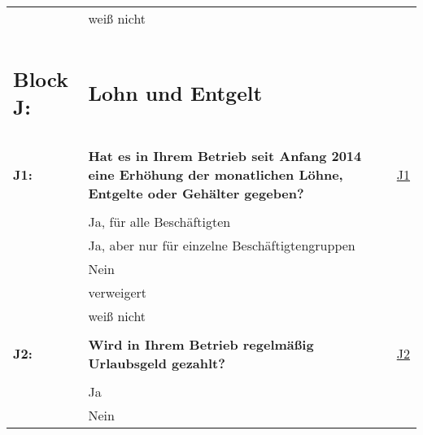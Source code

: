 \begin{longtable}{!{\color{black}\vline width 1pt}  L{2cm}!{\color{black}\vline width 1pt} L{12.25cm}!{\color{black}\vline width 1pt}  L{2.5cm}!{\color{black}\vline width 1pt}}
   & weiß nicht &  \\ 
   &  &  \\ 
   \midrule
{}\protect\subsection[\parbox{\mylength}{Block J:} Lohn und Entgelt]{Block J:} & \protect\subsection*{Lohn und Entgelt} &  \\ 
   &  &  \\ 
   \midrule
{}\textbf{J1:}\label{J1} & \textbf{Hat es in Ihrem Betrieb seit Anfang 2014 eine Erhöhung der monatlichen Löhne, Entgelte oder Gehälter gegeben?} & \hyperref[var:J1]{J1} \\ 
   &  &  \\ 
   & Ja, für alle Beschäftigten &  \\ 
   & Ja, aber nur für einzelne Beschäftigtengruppen &  \\ 
   & Nein &  \\ 
   & verweigert &  \\ 
   & weiß nicht &  \\ 
   &  &  \\ 
   \midrule
{}\textbf{J2:}\label{J2} & \textbf{Wird in Ihrem Betrieb regelmäßig Urlaubsgeld gezahlt?} & \hyperref[var:J2]{J2} \\ 
   &  &  \\ 
   & Ja &  \\ 
   & Nein &  \\ 

\end{longtable}
